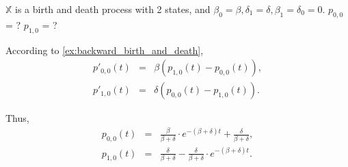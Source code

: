 \begin{question}
$ \mathbb{X} $ is a birth and death process with 2 states, and $ \beta_{0} = \beta, \delta_{1} = \delta, \beta_{1} = \delta_{0} = 0 $. $ p_{0, 0} $ = ? $ p_{1, 0} $ = ?

According to \autoref{ex:backward_birth_and_death},
\begin{eqnarray*}
p'_{0, 0}(t) & = & \beta (p_{1, 0}(t) - p_{0, 0}(t)), \\
p'_{1, 0}(t) & = & \delta (p_{0, 0}(t) - p_{1, 0}(t)).
\end{eqnarray*}

Thus,
\begin{eqnarray*}
p_{0, 0}(t) & = & \frac{\beta}{\beta + \delta} \cdot e^{-(\beta + \delta)t} + \frac{\delta}{\beta + \delta}, \\
p_{1, 0}(t) & = & \frac{\delta}{\beta + \delta} - \frac{\delta}{\beta + \delta} \cdot e^{-(\beta + \delta)t}.
\end{eqnarray*}
\end{question}
